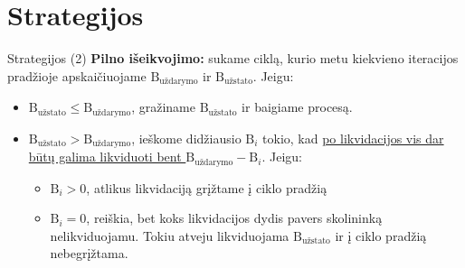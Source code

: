 \documentclass[12pt]{beamer}
\begin{document}
\section{Strategijos}
\begin{frame}{Strategijos (2)}
    \textbf{Pilno išeikvojimo:} sukame ciklą, kurio metu kiekvieno iteracijos pradžioje apskaičiuojame $\text{B}_{\text{uždarymo}}$ ir $\text{B}_{\text{užstato}}$. Jeigu:
    
    \begin{itemize}
        \item $\text{B}_{\text{užstato}} \leq \text{B}_{\text{uždarymo}}$, gražiname $\text{B}_{\text{užstato}}$ ir baigiame procesą.
        \item $\text{B}_{\text{užstato}} > \text{B}_{\text{uždarymo}}$, ieškome didžiausio $\text{B}_{i}$ tokio, kad \underline{po likvidacijos vis dar būtų galima likviduoti bent $\text{B}_{\text{uždarymo}} - \text{B}_{i}$}. Jeigu:
        \begin{itemize}
            \item $\text{B}_{i} > 0$, atlikus likvidaciją grįžtame į ciklo pradžią
            \item $\text{B}_{i} = 0$, reiškia, bet koks likvidacijos dydis pavers skolininką nelikviduojamu. Tokiu atveju likviduojama $\text{B}_{\text{užstato}}$ ir į ciklo pradžią nebegrįžtama.
        \end{itemize}
    

  \end{itemize}
\end{frame}
\end{document}
